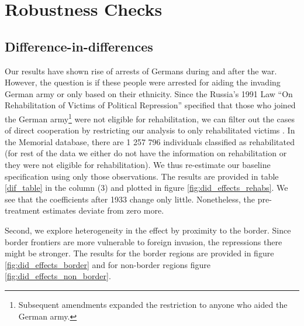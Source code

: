 \section{Robustness Checks} \label{subsec:robust_checks}
\subsection{Difference-in-differences}

Our results have shown rise of arrests of Germans during and after the war. 
However, the question is if these people were arrested for aiding the invading German army or only based on their ethnicity. 
Since the  Russia’s 1991 Law  \enquote{On Rehabilitation of Victims of Political Repression} specified  that those who joined the German army\footnote{Subsequent amendments expanded the restriction to anyone who aided the German army. }  were not eligible for rehabilitation, we can filter out the cases of direct 
cooperation by restricting  our analysis to only rehabilitated victims \citep{frierson_russias_2014}. 
In the Memorial database, there  are 1 257 796 individuals  classified as  rehabilitated (for rest of the data we either do not have the information on rehabilitation or they were not eligible for rehabilitation).  We thus re-estimate our baseline specification using only those observations. The results are provided in table \ref{dif_table} in the column (3) and plotted in figure \ref{fig:did_effects_rehabs}. We see that the coefficients after 1933 change only little. Nonetheless, the pre-treatment estimates deviate from zero more. 

Second, we explore heterogeneity in the effect by proximity to the border.
Since border frontiers are more vulnerable to foreign invasion, the repressions there might be stronger. 
The results for the border regions are provided in figure \ref{fig:did_effects_border} and for non-border regions figure \ref{fig:did_effects_non_border}. 




